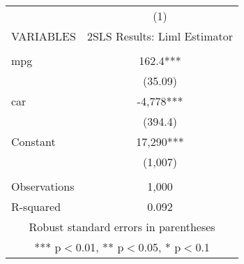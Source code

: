 \documentclass[]{article}
\begin{document}
\begin{tabular}{lc} \hline
 & (1) \\
VARIABLES & 2SLS Results: Liml Estimator \\ \hline
 &  \\
mpg & 162.4*** \\
 & (35.09) \\
car & -4,778*** \\
 & (394.4) \\
Constant & 17,290*** \\
 & (1,007) \\
 &  \\
Observations & 1,000 \\
 R-squared & 0.092 \\ \hline
\multicolumn{2}{c}{ Robust standard errors in parentheses} \\
\multicolumn{2}{c}{ *** p$<$0.01, ** p$<$0.05, * p$<$0.1} \\
\end{tabular}
\end{document}
